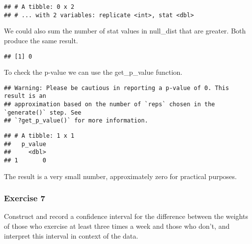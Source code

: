 \documentclass[
]{article}
\newenvironment{Shaded}{\begin{snugshade}}{\end{snugshade}}
\newcommand{\DataTypeTok}[1]{\textcolor[rgb]{0.13,0.29,0.53}{#1}}
\newcommand{\KeywordTok}[1]{\textcolor[rgb]{0.13,0.29,0.53}{\textbf{#1}}}
\newcommand{\NormalTok}[1]{#1}
\newcommand{\OperatorTok}[1]{\textcolor[rgb]{0.81,0.36,0.00}{\textbf{#1}}}
\newcommand{\StringTok}[1]{\textcolor[rgb]{0.31,0.60,0.02}{#1}}
\begin{document}
\begin{verbatim}
## # A tibble: 0 x 2
## # ... with 2 variables: replicate <int>, stat <dbl>
\end{verbatim}

We could also sum the number of stat values in null\_dist that are
greater. Both produce the same result.

\begin{Shaded}
\end{Shaded}

\begin{verbatim}
## [1] 0
\end{verbatim}

To check the p-value we can use the get\_p\_value function.

\begin{Shaded}
\end{Shaded}

\begin{verbatim}
## Warning: Please be cautious in reporting a p-value of 0. This result is an
## approximation based on the number of `reps` chosen in the `generate()` step. See
## `?get_p_value()` for more information.
\end{verbatim}

\begin{verbatim}
## # A tibble: 1 x 1
##   p_value
##     <dbl>
## 1       0
\end{verbatim}

The result is a very small number, approximately zero for practical
purposes.

\hypertarget{exercise-7}{%
\subsubsection{Exercise 7}\label{exercise-7}}

Construct and record a confidence interval for the difference between
the weights of those who exercise at least three times a week and those
who don't, and interpret this interval in context of the data.
\end{document}
